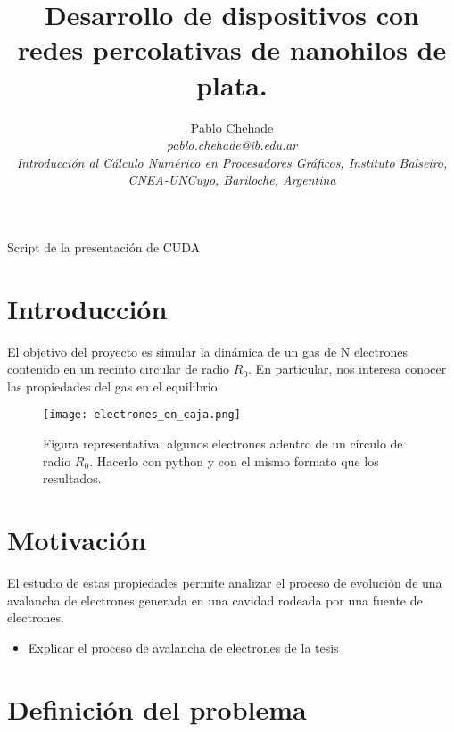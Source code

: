 \documentclass[aps,prb,twocolumn,superscriptaddress,floatfix,longbibliography]{revtex4-2}
\begin{document}
\newcommand{\mytitle}{Desarrollo de dispositivos con redes percolativas de nanohilos de plata.}

\title{\mytitle}

\author{Pablo Chehade \\
    \small \textit{pablo.chehade@ib.edu.ar} \\
    \small \textit{Introducción al Cálculo Numérico en Procesadores Gráficos, Instituto Balseiro, CNEA-UNCuyo, Bariloche, Argentina} \\}


\maketitle

Script de la presentación de CUDA


\section{Introducción}
El objetivo del proyecto es simular la dinámica de un gas de N electrones contenido en un recinto circular de radio $R_0$. En particular, nos interesa conocer las propiedades del gas en el equilibrio.

\begin{figure}[h]
    \texttt{[image: electrones\_en\_caja.png]}
    \caption{Figura representativa: algunos electrones adentro de un círculo de radio $R_0$. Hacerlo con python y con el mismo formato que los resultados.}
     \label{fig:electrones_en_caja}
\end{figure}






\section{Motivación}
El estudio de estas propiedades permite analizar el proceso de evolución de una avalancha de electrones generada en una cavidad rodeada por una fuente de electrones.


\begin{itemize}
    \item Explicar el proceso de avalancha de electrones de la tesis
\end{itemize}


\section{Definición del problema}
\end{document}
